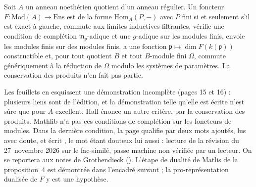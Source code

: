 \begin{encadre}
\begin{theoreme*}\nonverifie
Soit $A$ un anneau noethérien quotient d'un anneau régulier. Un foncteur $F : \mathrm{Mod}(A) \to \mathrm{Ens}$ est de la forme $\mathrm{Hom}_A(P, -)$ avec $P$ fini si et seulement s'il est exact à gauche, commute aux limites inductives filtrantes, vérifie une condition de complétion $\mathfrak m_{\mathfrak p}$-adique et une $g$-adique sur les modules finis, envoie les modules finis sur des modules finis, a une fonction $\mathfrak p \mapsto \dim F(k(\mathfrak p))$ constructible et, pour tout quotient $B$ et tout $B$-module fini $\Omega$, commute génériquement à la réduction de $\Omega$ modulo les systèmes de paramètres. La conservation des produits n'en fait pas partie.
\end{theoreme*}
\end{encadre}
{\small Les feuillets en esquissent une démonstration incomplète (pages 15 et 16) : plusieurs liens sont de l'édition, et la démonstration telle qu'elle est écrite n'est sûre que pour $A$ excellent. Hall énonce un autre critère, par la conservation des produits. Mathlib n'a pas ces conditions de complétion sur les foncteurs de modules. Dans la dernière condition, la page qualifie  par deux mots ajoutés, lus  avec doute, et écrit , le mot  étant douteux lui aussi : lecture de la révision du 27~novembre 2026 sur le fac-similé, passe machine non vérifiée par un lecteur. On se reportera aux notes de Grothendieck (). L'étape de dualité de Matlis de la proposition~4 est démontrée dans l'encadré suivant ; la pro-représentation dualisée de $F$ y est une hypothèse.\par}

